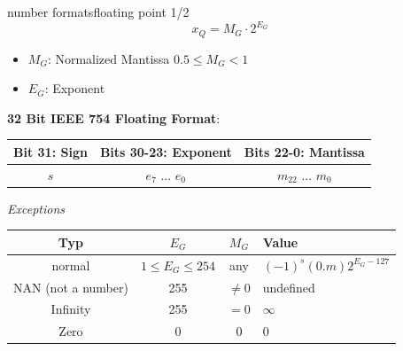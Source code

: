 	\begin{frame}{number formats}{floating point 1/2}
		\begin{equation*}
		x_Q = M_G \cdot 2^{E_G}
		\end{equation*}
		
		\begin{itemize}
			\item	$M_G$: Normalized Mantissa $ 0.5 \leq M_{G} < 1$
			\item	$E_G$: Exponent
		\end{itemize}
		
		\pause
		\textbf{32 Bit IEEE 754 Floating Format}:
		\begin{table}
			\centering
			\begin{footnotesize}
				\begin{tabular}{ccc}
				\hline
				\textbf{Bit 31: Sign} & \textbf{Bits 30-23: Exponent} & \textbf{Bits 22-0: Mantissa}\\
				\hline
				$s$ & $e_{7}$ ... $e_{0}$ & $m_{22}$ ... $m_{0}$\\
				\hline
				\end{tabular}
			\end{footnotesize}
		\end{table}
		\pause
		\textit{Exceptions}
		\vspace{-3mm}
		\begin{table}
			\centering
			\begin{footnotesize}
					\begin{tabular}{cccl}
					\hline
					\textbf{Typ} & \textbf{$E_G$} & \textbf{$M_{G}$} & \textbf{Value}\\
					\hline 
					normal & $1\leq E_G \leq 254$ & any & $(-1)^s (0.m)2^{E_G-127}$\\
					\hline
					NAN (not a number)& 255 & $\neq 0$ & undefined\\
					\hline
					Infinity & 255 & $=0$ & $\infty$\\
					\hline
					Zero & 0 & 0 & 0\\
					\hline
					\end{tabular}
			\end{footnotesize}
		\end{table}
	\end{frame}	
	
